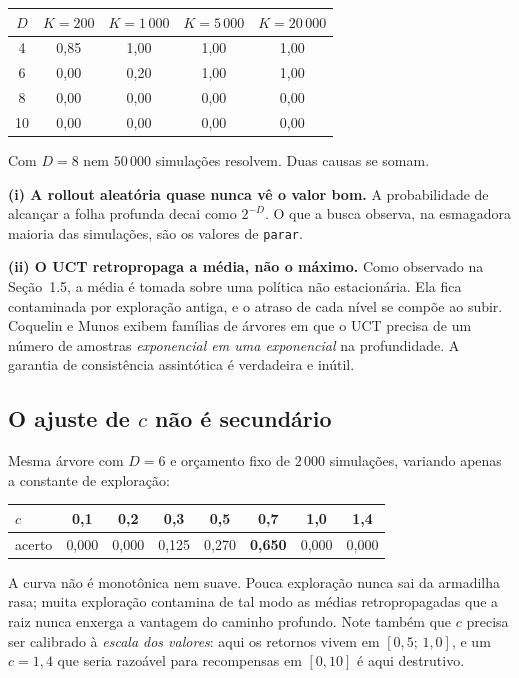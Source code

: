 \documentclass[11pt]{article}
\begin{document}
\begin{center}
\begin{tabular}{ccccc}
\toprule
$D$ & $K=200$ & $K=1\,000$ & $K=5\,000$ & $K=20\,000$ \\
\midrule
4  & 0,85 & 1,00 & 1,00 & 1,00 \\
6  & 0,00 & 0,20 & 1,00 & 1,00 \\
8  & 0,00 & 0,00 & 0,00 & 0,00 \\
10 & 0,00 & 0,00 & 0,00 & 0,00 \\
\bottomrule
\end{tabular}
\end{center}

Com $D = 8$ nem $50\,000$ simulações resolvem. Duas causas se somam.

\textbf{(i) A rollout aleatória quase nunca vê o valor bom.} A probabilidade de
alcançar a folha profunda decai como $2^{-D}$. O que a busca observa, na esmagadora
maioria das simulações, são os valores de \texttt{parar}.

\textbf{(ii) O UCT retropropaga a média, não o máximo.} Como observado na
Seção~1.5, a média é tomada sobre uma política não estacionária. Ela fica
contaminada por exploração antiga, e o atraso de cada nível se compõe ao subir.
Coquelin e Munos exibem famílias de árvores em que o UCT precisa de um número de
amostras \emph{exponencial em uma exponencial} na profundidade. A garantia de
consistência assintótica é verdadeira e inútil.

\subsection{O ajuste de $c$ não é secundário}

Mesma árvore com $D = 6$ e orçamento fixo de $2\,000$ simulações, variando apenas
a constante de exploração:

\begin{center}
\begin{tabular}{lccccccc}
\toprule
$c$ & 0,1 & 0,2 & 0,3 & 0,5 & \textbf{0,7} & 1,0 & 1,4 \\
\midrule
acerto & 0,000 & 0,000 & 0,125 & 0,270 & \textbf{0,650} & 0,000 & 0,000 \\
\bottomrule
\end{tabular}
\end{center}

A curva não é monotônica nem suave. Pouca exploração nunca sai da armadilha rasa;
muita exploração contamina de tal modo as médias retropropagadas que a raiz nunca
enxerga a vantagem do caminho profundo. Note também que $c$ precisa ser calibrado
à \emph{escala dos valores}: aqui os retornos vivem em $[0{,}5;\,1{,}0]$, e um
$c = 1{,}4$ que seria razoável para recompensas em $[0,10]$ é aqui destrutivo.
\end{document}
